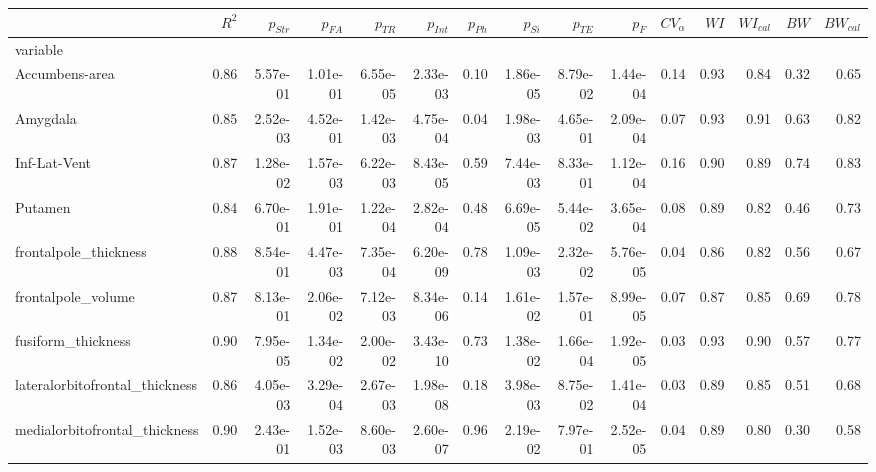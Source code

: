 \begin{table}
[]
\centering
\begin{tabular}{lrrrrrrrrrrrrrr}
\toprule
{} &    $R^2$ &  $p_{Str}$ &  $p_{FA}$ &      $p_{TR}$ &  $p_{Int}$ &  $p_{Ph}$ &  $p_{Si}$ &      $p_{TE}$ &       $p_F$ &   $CV_{\alpha}$ &    $WI$ &  $WI_{cal}$ &    $BW$ &  $BW_{cal}$ \\
\midrule
variable                           &       &             &              &           &              &               &               &           &           &       &       &         &       &         \\
Accumbens-area                     &  0.86 &    5.57e-01 &     1.01e-01 &  6.55e-05 &     2.33e-03 &          0.10 &      1.86e-05 &  8.79e-02 &  1.44e-04 &  0.14 &  0.93 &    0.84 &  0.32 &    0.65 \\
Amygdala                           &  0.85 &    2.52e-03 &     4.52e-01 &  1.42e-03 &     4.75e-04 &          0.04 &      1.98e-03 &  4.65e-01 &  2.09e-04 &  0.07 &  0.93 &    0.91 &  0.63 &    0.82 \\
Inf-Lat-Vent                       &  0.87 &    1.28e-02 &     1.57e-03 &  6.22e-03 &     8.43e-05 &          0.59 &      7.44e-03 &  8.33e-01 &  1.12e-04 &  0.16 &  0.90 &    0.89 &  0.74 &    0.83 \\
Putamen                            &  0.84 &    6.70e-01 &     1.91e-01 &  1.22e-04 &     2.82e-04 &          0.48 &      6.69e-05 &  5.44e-02 &  3.65e-04 &  0.08 &  0.89 &    0.82 &  0.46 &    0.73 \\
frontalpole\_thickness              &  0.88 &    8.54e-01 &     4.47e-03 &  7.35e-04 &     6.20e-09 &          0.78 &      1.09e-03 &  2.32e-02 &  5.76e-05 &  0.04 &  0.86 &    0.82 &  0.56 &    0.67 \\
frontalpole\_volume                 &  0.87 &    8.13e-01 &     2.06e-02 &  7.12e-03 &     8.34e-06 &          0.14 &      1.61e-02 &  1.57e-01 &  8.99e-05 &  0.07 &  0.87 &    0.85 &  0.69 &    0.78 \\
fusiform\_thickness                 &  0.90 &    7.95e-05 &     1.34e-02 &  2.00e-02 &     3.43e-10 &          0.73 &      1.38e-02 &  1.66e-04 &  1.92e-05 &  0.03 &  0.93 &    0.90 &  0.57 &    0.77 \\
lateralorbitofrontal\_thickness     &  0.86 &    4.05e-03 &     3.29e-04 &  2.67e-03 &     1.98e-08 &          0.18 &      3.98e-03 &  8.75e-02 &  1.41e-04 &  0.03 &  0.89 &    0.85 &  0.51 &    0.68 \\
medialorbitofrontal\_thickness      &  0.90 &    2.43e-01 &     1.52e-03 &  8.60e-03 &     2.60e-07 &          0.96 &      2.19e-02 &  7.97e-01 &  2.52e-05 &  0.04 &  0.89 &    0.80 &  0.30 &    0.58 \\

\end{tabular}
\end{table}
